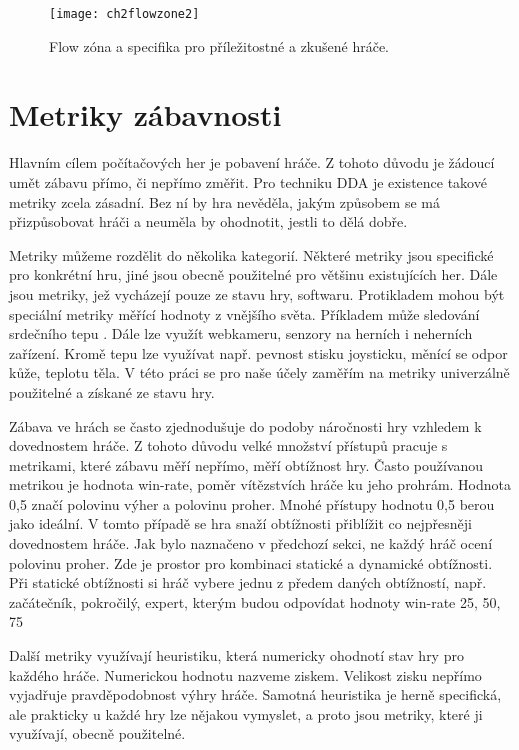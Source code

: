 \begin{figure}
  \centering
  \texttt{[image: ch2flowzone2]}
	\caption{Flow zóna a specifika pro příležitostné a zkušené hráče. }
	\label{fig:ch2flowzone2}
\end{figure}	

\section{Metriky zábavnosti} \label{sec:defzab}

Hlavním cílem počítačových her je pobavení hráče. Z tohoto důvodu je žádoucí umět zábavu přímo, či nepřímo změřit. Pro techniku DDA je existence takové metriky zcela zásadní. Bez ní by hra nevěděla, jakým způsobem se má přizpůsobovat hráči a neuměla by ohodnotit, jestli to dělá dobře. 

Metriky můžeme rozdělit do několika kategorií. Některé metriky jsou specifické pro konkrétní hru, jiné jsou obecně použitelné pro většinu existujících her. Dále jsou metriky, jež vycházejí pouze ze stavu hry, softwaru. Protikladem mohou být speciální metriky měřící hodnoty z vnějšího světa. Příkladem může sledování srdečního tepu \cite{7}. Dále lze využít webkameru, senzory na herních i neherních zařízení. Kromě tepu lze využívat např. pevnost stisku joysticku, měnící se odpor kůže, teplotu těla\cite{16Survey}. V této práci se pro naše účely zaměřím na metriky univerzálně použitelné a získané ze stavu hry.

Zábava ve hrách se často zjednodušuje do podoby náročnosti hry vzhledem k dovednostem hráče. Z tohoto důvodu velké množství přístupů pracuje s metrikami, které zábavu měří nepřímo, měří obtížnost hry. Často používanou metrikou je hodnota win-rate, poměr vítězstvích hráče ku jeho prohrám. Hodnota 0,5 značí polovinu výher a polovinu proher. Mnohé přístupy hodnotu 0,5 berou jako ideální. V tomto případě se hra snaží obtížnosti přiblížit co nejpřesněji dovednostem hráče. Jak bylo naznačeno v předchozí sekci, ne každý hráč ocení polovinu proher. Zde je prostor pro kombinaci statické a dynamické obtížnosti. Při statické obtížnosti si hráč vybere jednu z předem daných obtížností, např. začátečník, pokročilý, expert, kterým budou odpovídat hodnoty win-rate 25, 50, 75 %

Další metriky využívají heuristiku, která numericky ohodnotí stav hry pro každého hráče. Numerickou hodnotu nazveme ziskem. Velikost zisku nepřímo vyjadřuje pravděpodobnost výhry hráče. Samotná heuristika je herně specifická, ale prakticky u každé hry lze nějakou vymyslet, a proto jsou metriky, které ji využívají, obecně použitelné. 

